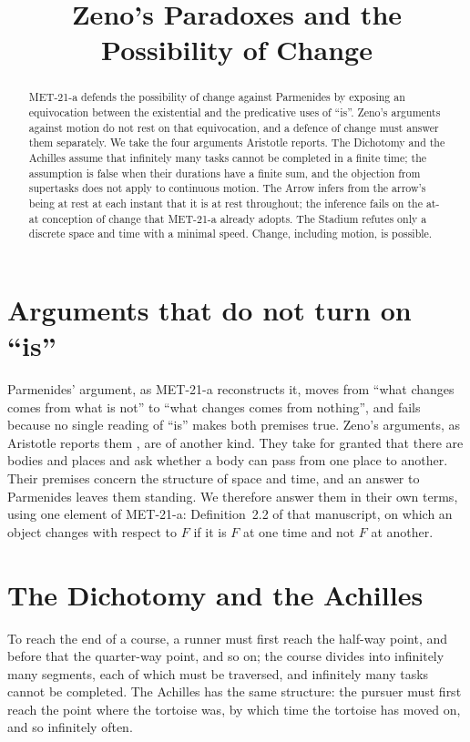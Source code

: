 \documentclass{situationist-preprint}
\title{Zeno's Paradoxes and the Possibility of Change}
\begin{document}
\maketitle

\begin{abstract}
MET-21-a defends the possibility of change against Parmenides by exposing an equivocation between the existential and the predicative uses of \enquote{is}. Zeno's arguments against motion do not rest on that equivocation, and a defence of change must answer them separately. We take the four arguments Aristotle reports. The Dichotomy and the Achilles assume that infinitely many tasks cannot be completed in a finite time; the assumption is false when their durations have a finite sum, and the objection from supertasks does not apply to continuous motion. The Arrow infers from the arrow's being at rest at each instant that it is at rest throughout; the inference fails on the at-at conception of change that MET-21-a already adopts. The Stadium refutes only a discrete space and time with a minimal speed. Change, including motion, is possible.
\end{abstract}

\section{Arguments that do not turn on \enquote{is}}

Parmenides' argument, as MET-21-a reconstructs it, moves from \enquote{what changes comes from what is not} to \enquote{what changes comes from nothing}, and fails because no single reading of \enquote{is} makes both premises true. Zeno's arguments, as Aristotle reports them \citep[VI.9]{AristotlePhys}, are of another kind. They take for granted that there are bodies and places and ask whether a body can pass from one place to another. Their premises concern the structure of space and time, and an answer to Parmenides leaves them standing. We therefore answer them in their own terms, using one element of MET-21-a: Definition~2.2 of that manuscript, on which an object changes with respect to $F$ if it is $F$ at one time and not $F$ at another.

\section{The Dichotomy and the Achilles}

To reach the end of a course, a runner must first reach the half-way point, and before that the quarter-way point, and so on; the course divides into infinitely many segments, each of which must be traversed, and infinitely many tasks cannot be completed. The Achilles has the same structure: the pursuer must first reach the point where the tortoise was, by which time the tortoise has moved on, and so infinitely often.
\end{document}
